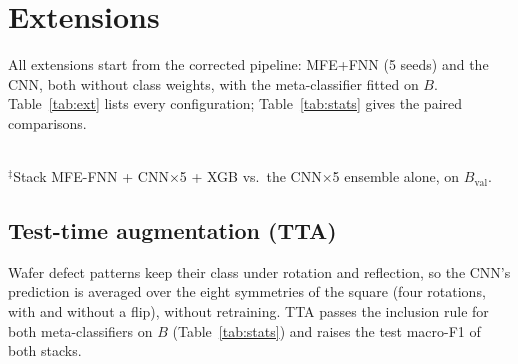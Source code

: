 \documentclass[conference]{IEEEtran}
\newcommand{\Bval}{B_{\mathrm{val}}}
\begin{document}
\section{Extensions}
\label{sec:ext}
All extensions start from the corrected pipeline: MFE+FNN (5 seeds) and the CNN, both without class weights, with the
meta-classifier fitted on $B$. Table~\ref{tab:ext} lists every configuration; Table~\ref{tab:stats} gives the paired
comparisons.

\begin{table}[t]
\centering
\caption{Extensions. $B$: two-fold cross-fitted macro-F1 on $B$ (selection); test: macro-F1 on the 10,000 test maps.
CNN$\times$5: average of five CNN seeds, each with test-time augmentation. Rows without $\pm$: a single deterministic run.}
\label{tab:ext}
\setlength{\tabcolsep}{3pt}
\end{table}

\begin{table}[t]
\centering
\caption{Paired comparisons (difference in macro-F1, $t$-test across runs, 95\% wafer-bootstrap interval).}
\label{tab:stats}
\setlength{\tabcolsep}{3pt}
\\[2pt]
\footnotesize{$^\ddagger$Stack MFE-FNN + CNN$\times$5 + XGB vs.\ the CNN$\times$5 ensemble alone, on $\Bval$.}
\end{table}

\subsection{Test-time augmentation (TTA)}
Wafer defect patterns keep their class under rotation and reflection, so the CNN's prediction is averaged over the eight
symmetries of the square (four rotations, with and without a flip), without retraining. TTA passes the inclusion rule for
both meta-classifiers on $B$ (Table~\ref{tab:stats}) and raises the test macro-F1 of both stacks.
\end{document}
